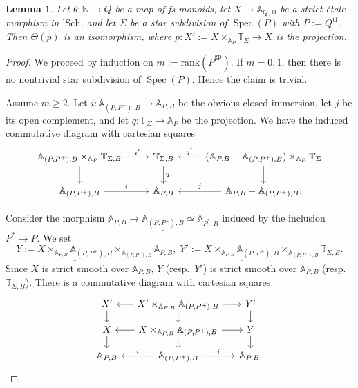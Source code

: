 \documentclass[10pt]{amsart}
\newtheorem{lem}[thm]{Lemma}
\theoremstyle{definition}
\theoremstyle{remark}
\numberwithin{equation}{subsection}
\newcommand{\A}{\mathbb{A}}
\newcommand{\N}{\mathbb{N}}
\newcommand{\T}{\mathbb{T}}
\DeclareMathOperator{\Spec}{Spec}
\newcommand{\ul}{\underline}
\newcommand{\ol}{\overline}
\newcommand{\tf}{\mathrm{tf}}
\newcommand{\rank}{\mathrm{rank}}
\newcommand{\lSch}{\mathrm{lSch}}
\newcommand{\gp}{\mathrm{gp}}
\begin{document}
\begin{lem}
\label{lemma.8}
Let $\theta\colon \N\to Q$ be a map of fs monoids, let $X\to \A_{Q,B}$ be a strict \'etale morphism in $\lSch$, and let $\Sigma$ be a star subdivision of $\Spec(P)$ with $P:=Q^\tf$.
Then $\Theta(p)$ is an isomorphism, where $p\colon X':=X\times_{\A_P}\T_{\Sigma}\to X$ is the projection.
\end{lem}
\begin{proof}
We proceed by induction on $m:=\rank(\ol{P}^\gp)$.
If $m=0,1$, then there is no nontrivial star subdivision of $\Spec(P)$.
Hence the claim is trivial.

Assume $m\geq 2$.
Let $i\colon \A_{(P,P^+),B}\to \A_{P,B}$ be the obvious closed immersion, let $j$ be its open complement, and let $q\colon \T_\Sigma\to \A_P$ be the projection.
We have the induced commutative diagram with cartesian squares
\begin{equation}
\label{lemma.8.1}
\begin{tikzcd}
\A_{(P,P^+),B}\times_{\A_P}\T_{\Sigma,B}\ar[d]\ar[r,"i'"]&
\T_{\Sigma,B}\ar[d,"q"]\ar[r,leftarrow,"j'"]&
(\A_{P,B}-\A_{(P,P^+),B})\times_{\A_P}\T_\Sigma\ar[d]
\\
\A_{(P,P^+),B}\ar[r,"i"]&
\A_{P,B}\ar[r,leftarrow,"j"]&
\A_{P,B}-\A_{(P,P^+),B}.
\end{tikzcd}
\end{equation}

Consider the morphism $\A_{P,B}\to \ul{ \A_{(P,P^+),B}}\simeq \A_{P^*,B}$ induced by the inclusion $P^*\to P$.
We set
\[
Y:=\ul{X\times_{\A_{P,B}} \A_{(P,P^+),B}}\times_{\ul{\A_{(P,P^+),B}}}\A_{P,B},
\;
Y':=\ul{X\times_{\A_{P,B}} \A_{(P,P^+),B}}\times_{\ul{\A_{(P,P^+),B}}}\T_{\Sigma,B}.
\]
Since $X$ is strict smooth over $\A_{P,B}$, $Y$ (resp.\ $Y'$) is strict smooth over $\A_{P,B}$ (resp.\ $\T_{\Sigma,B}$).
There is a commutative diagram with cartesian squares
\begin{equation}
\label{lemma.8.2}
\begin{tikzcd}[column sep=small, row sep=small]
X'\ar[r,leftarrow]\ar[d]&
X'\times_{\A_{P,B}}\A_{(P,P^+),B}\ar[r]\ar[d]&
Y'\ar[d]
\\
X\ar[r,leftarrow]\ar[d]&
X\times_{\A_{P,B}}\A_{(P,P^+),B}\ar[d]\ar[r]&
Y\ar[d]
\\
\A_{P,B}\ar[r,leftarrow,"i"]&
\A_{(P,P^+),B}\ar[r,"i"]&
\A_{P,B}.
\end{tikzcd}
\end{equation}



\end{proof}
\end{document}
